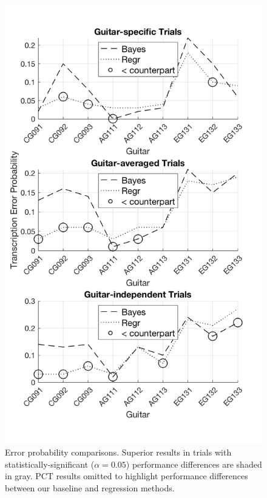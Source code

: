 \documentclass[convention,peer-reviewed]{aesconf}
\begin{document}
\begin{figure}[!htbp]
\centering
\includegraphics[scale=0.275]{novel-methods-sig-comp}
\caption{Error probability comparisons. Superior results in trials with statistically-significant ($\alpha=0.05$) performance differences are shaded in gray. PCT results omitted to highlight performance differences between our baseline and regression methods.}
\label{tab:mcnemar-RWC}
\end{figure}
\end{document}
